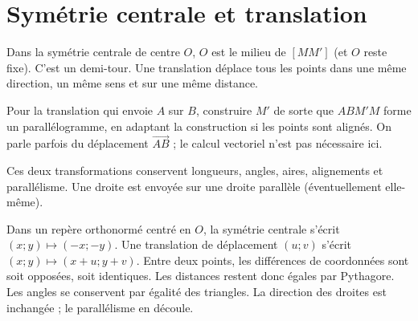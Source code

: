\documentclass[../cours_3e.tex]{subfiles}
\begin{document}
\section{Symétrie centrale et translation}
\begin{definition}
Dans la symétrie centrale de centre $O$, $O$ est le milieu de $[MM']$ (et $O$ reste fixe). C'est un demi-tour.
Une translation déplace tous les points dans une même direction, un même sens et sur une même distance.
\end{definition}
Pour la translation qui envoie $A$ sur $B$, construire $M'$ de sorte que $ABM'M$ forme un parallélogramme, en adaptant la construction si les points sont alignés. On parle parfois du déplacement $\overrightarrow{AB}$ ; le calcul vectoriel n'est pas nécessaire ici.
\begin{propriete}
Ces deux transformations conservent longueurs, angles, aires, alignements et parallélisme. Une droite est envoyée sur une droite parallèle (éventuellement elle-même).
\end{propriete}
\begin{demonstration}
Dans un repère orthonormé centré en $O$, la symétrie centrale s'écrit $(x;y)\mapsto(-x;-y)$. Une translation de déplacement $(u;v)$ s'écrit $(x;y)\mapsto(x+u;y+v)$. Entre deux points, les différences de coordonnées sont soit opposées, soit identiques. Les distances restent donc égales par Pythagore. Les angles se conservent par égalité des triangles. La direction des droites est inchangée ; le parallélisme en découle.
\end{demonstration}
\end{document}
